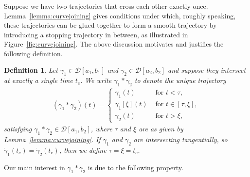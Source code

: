 \documentclass[a4paper]{article}
\theoremstyle{definition}
\theoremstyle{plain}
\newtheorem{define}{Definition\hspace{0.25em}\ignorespaces}
\begin{document}
Suppose we have two trajectories that cross each other exactly once. Lemma~\ref{lemma:curvejoining}
gives conditions under which, roughly speaking, these trajectories can be glued
together to form a smooth trajectory by introducing a stopping trajectory in
between, as illustrated in Figure~\ref{fig:curvejoining}. The above discussion motivates and
justifies the following definition.

\begin{define}
  Let $\gamma_{1} \in \mathcal{D}[a_{1}, b_{1}]$ and
  $\gamma_{2} \in \mathcal{D}[a_{2}, b_{2}]$ and suppose they intersect at
  exactly a single time $t_{c}$. We write $\gamma_{1} * \gamma_{2}$ to denote
  the unique trajectory
  \begin{align}
    (\gamma_{1} * \gamma_{2})(t) =
    \begin{cases}
      \gamma_{1}(t) & \text{ for } t < \tau , \\
      \gamma_{1}[\xi](t) & \text{ for } t \in [\tau, \xi] , \\
      \gamma_{2}(t) & \text{ for } t > \xi ,
    \end{cases}
  \end{align}
  satisfying $\gamma_{1} * \gamma_{2} \in \mathcal{D}[a_{1}, b_{2}]$, where
  $\tau$ and $\xi$ are as given by Lemma~\ref{lemma:curvejoining}.
  If $\gamma_{1}$ and $\gamma_{2}$ are intersecting tangentially, so
  $\dot{\gamma}_{1}(t_{c}) = \dot{\gamma}_{2}(t_{c})$, then we define
  $\tau=\xi=t_{c}$.
\end{define}

Our main interest in $\gamma_{1} * \gamma_{2}$ is due to the following property.
\end{document}
